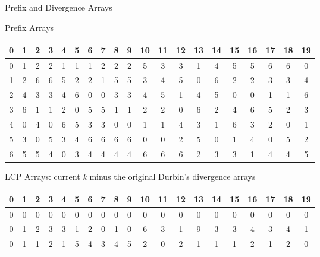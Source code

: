 \documentclass{beamer}
\begin{document}
\begin{frame}{Prefix and Divergence Arrays}
  \begin{block}{Prefix Arrays}
    \begin{table}[H]
      \tiny
      \begin{tabular}{c|c|c|c|c|c|c|c|c|c|c|c|c|c|c|c|c|c|c|c}
        \hline
        0 & 1 & 2 & 3 & 4 & 5 & 6 & 7 & 8 & 9 & 10 & 11 & 12 & 13 & 14 & 15 & 16
        & 17 & 18 & 19\\
        \hline
        \hline
        0 & 1 & 2 & 2 & 1 & 1 & 1 & 2 & 2 & 2 & 5 & 3 & 3 & 1 & 4 & 5 & 5 & 6
             & 6 & 0\\  
        1 & 2 & 6 & 6 & 5 & 2 & 2 & 1 & 5 & 5 & 3 & 4 & 5 & 0 & 6 & 2 & 2 & 3
             & 3 & 4\\  
        2 & 4 & 3 & 3 & 4 & 6 & 0 & 0 & 3 & 3 & 4 & 5 & 1 & 4 & 5 & 0 & 0 & 1
             & 1 & 6\\  
        3 & 6 & 1 & 1 & 2 & 0 & 5 & 5 & 1 & 1 & 2 & 2 & 0 & 6 & 2 & 4 & 6 & 5
             & 2 & 3\\  
        4 & 0 & 4 & 0 & 6 & 5 & 3 & 3 & 0 & 0 & 1 & 1 & 4 & 3 & 1 & 6 & 3 & 2
             & 0 & 1\\  
        5 & 3 & 0 & 5 & 3 & 4 & 6 & 6 & 6 & 6 & 0 & 0 & 2 & 5 & 0 & 1 & 4 & 0
             & 5 & 2\\
        6 & 5 & 5 & 4 & 0 & 3 & 4 & 4 & 4 & 4 & 6 & 6 & 6 & 2 & 3 & 3 & 1 & 4
             & 4 & 5\\
        \hline
      \end{tabular}
    \end{table}
  \end{block}
  \begin{block}{LCP Arrays: current \textit{k} minus the original Durbin's
      divergence arrays}  
    \begin{table}[H]
      \tiny
      \begin{tabular}{c|c|c|c|c|c|c|c|c|c|c|c|c|c|c|c|c|c|c|c}
        \hline
        0 & 1 & 2 & 3 & 4 & 5 & 6 & 7 & 8 & 9 & 10 & 11 & 12 & 13 & 14 & 15 & 16
        & 17 & 18 & 19\\
        \hline
        \hline
        0 & 0 & 0 & 0 & 0 & 0 & 0 & 0 & 0 & 0 & 0 & 0 & 0 & 0 & 0 & 0 & 0 & 0
             & 0 & 0 \\
        0 & 1 & 2 & 3 & 3 & 1 & 2 & 0 & 1 & 0 & 6 & 3 & 1 & 9 & 3 & 3 & 4 & 3
             & 4 & 1 \\
        0 & 1 & 1 & 2 & 1 & 5 & 4 & 3 & 4 & 5 & 2 & 0 & 2 & 1 & 1 & 1 & 2 & 1
             & 2 & 0 \\

\end{tabular}
\end{table}
\end{block}
\end{frame}
\end{document}
